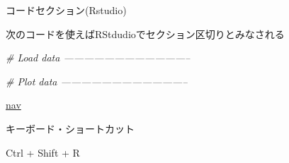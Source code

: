 \documentclass[ignorenonframetext,]{beamer}
\newenvironment{Shaded}{\begin{snugshade}}{\end{snugshade}}
\newcommand{\CommentTok}[1]{\textcolor[rgb]{0.56,0.35,0.01}{\textit{#1}}}
\begin{document}
\begin{frame}[fragile]{コードセクション(Rstudio)}

次のコードを使えばRStdudioでセクション区切りとみなされる

\begin{Shaded}
\begin{Highlighting}[]
\CommentTok{# Load data --------------------------------------}

\CommentTok{# Plot data --------------------------------------}
\end{Highlighting}
\end{Shaded}

\href{../img/rstudio-nav.png}{nav}

\begin{block}{キーボード・ショートカット}

Ctrl + Shift + R

\end{block}

\end{frame}
\end{document}
